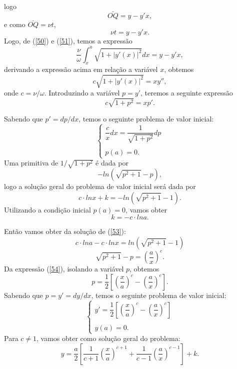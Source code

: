 \documentclass[blue]{beamer}
\numberwithin{equation}{section}
\begin{document}
\begin{frame}
	\justifying
	logo 
	$$\bar{OQ} = y - y'x,$$
	e como $\bar{OQ} = \nu t$,
	\begin{equation} \label{51}
	\nu t = y - y'x.
	\end{equation}
	Logo, de (\ref{50}) e (\ref{51}), temos a expressão
	$$\dfrac{\nu}{\omega} \int_x^a \sqrt{1 + |y'(x)|^2} dx = y - y'x,$$
	derivando a expressão acima em relação a variável $x$, obtemos
	\begin{equation} \label{52}
	c\sqrt{1 + |y'(x)|^2} = xy'',
	\end{equation}
	onde $c = \nu / \omega$. Introduzindo a variável $p = y'$, teremos a seguinte expressão
	\begin{equation} \label{53}
	c\sqrt{1 + p^2} = xp'.
	\end{equation}
		
\end{frame}

\begin{frame}
\justifying
\hspace{0.2cm} Sabendo que $p' = dp/dx$, temos o seguinte problema de valor inicial:
$$\left\lbrace
\begin{array}{lcl} 
\dfrac{c}{x} dx = \dfrac{1}{\sqrt{1 + p^2}} dp \\
\\
p(a) = 0.
\end{array}
\right.$$
Uma primitiva de $1/\sqrt{1 +p^2}$ é dada por
$$-ln(\sqrt{p^2 + 1} - p),$$
logo a solução geral do problema de valor inicial será dada por
$$c \cdot lnx + k = - ln(\sqrt{p^2 + 1} - 1).$$
Utilizando a condição inicial $p(a) = 0$, vamos obter
$$k = -c \cdot lna.$$
	
\end{frame}

\begin{frame}
	\justifying
	\hspace{0.2cm} Então vamos obter da solução de (\ref{53}):
	$$c \cdot lna - c \cdot lnx = ln(\sqrt{p^2 + 1} - 1)$$ 
	\begin{equation} \label{54}
	\sqrt{p^2 + 1} - p = \left(\dfrac{a}{x}\right)^c.
	\end{equation}
	Da expressão (\ref{54}), isolando a variável $p$, obtemos
	$$p = \dfrac{1}{2} \left[\left(\dfrac{x}{a}\right)^c - \left(\dfrac{a}{x}\right)^c \right].$$
	Sabendo que $p = y' = dy/dx$, temos o seguinte problema de valor inicial:
	$$\left\lbrace
	\begin{array}{lcl} 
	y' = \dfrac{1}{2} \left[\left(\dfrac{x}{a}\right)^c - \left(\dfrac{a}{x}\right)^c \right] \\
	\\
	y(a) = 0.
	\end{array}
	\right.$$
	\hspace{0.2cm} Para $c\neq1$, vamos obter como solução geral do problema:
	$$y = \dfrac{a}{2} \left[\dfrac{1}{c+1} \left(\dfrac{x}{a}\right)^{c+1} + \dfrac{1}{c-1} \left(\dfrac{a}{x}\right)^{c-1} \right] + k.$$
		
\end{frame}
\end{document}
